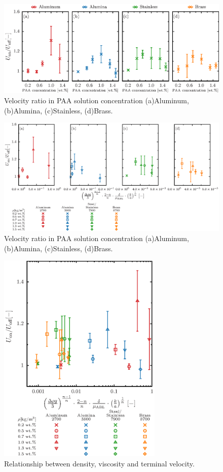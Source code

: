 \begin{figure}[ht]
    \centering
    \includegraphics[width=1.0\textwidth]{./5-Results/concentrationUdiff.eps}
    \caption{Velocity ratio in PAA solution concentration (a)Aluminum, (b)Alumina, (c)Stainless, (d)Brass.}
    \label{fig:concentrationUdiff}
\end{figure}

\begin{figure}[ht]
    \centering
    \includegraphics[width=1.0\textwidth]{./5-Results/concentrationUdiff_each.eps}
    \caption{Velocity ratio in PAA solution concentration (a)Aluminum, (b)Alumina, (c)Stainless, (d)Brass.}
    \label{fig:concentrationUdiff2}
\end{figure}

\begin{figure}[ht]
    \centering
    \includegraphics[width=0.7\textwidth]{./5-Results/concentrationUdiffAll.eps}
    \caption{Relationship between density, viscosity and terminal velocity.}
    \label{fig:concentrationUdiffAll}
\end{figure}